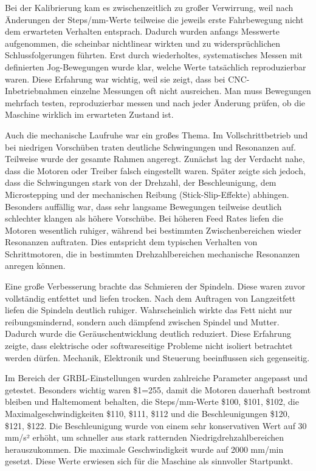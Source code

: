 Bei der Kalibrierung kam es zwischenzeitlich zu großer Verwirrung, weil nach Änderungen der Steps/mm-Werte teilweise die jeweils erste Fahrbewegung nicht dem erwarteten Verhalten entsprach. Dadurch wurden anfangs Messwerte aufgenommen, die scheinbar nichtlinear wirkten und zu widersprüchlichen Schlussfolgerungen führten. Erst durch wiederholtes, systematisches Messen mit definierten Jog-Bewegungen wurde klar, welche Werte tatsächlich reproduzierbar waren. Diese Erfahrung war wichtig, weil sie zeigt, dass bei CNC-Inbetriebnahmen einzelne Messungen oft nicht ausreichen. Man muss Bewegungen mehrfach testen, reproduzierbar messen und nach jeder Änderung prüfen, ob die Maschine wirklich im erwarteten Zustand ist.

Auch die mechanische Laufruhe war ein großes Thema. Im Vollschrittbetrieb und bei niedrigen Vorschüben traten deutliche Schwingungen und Resonanzen auf. Teilweise wurde der gesamte Rahmen angeregt. Zunächst lag der Verdacht nahe, dass die Motoren oder Treiber falsch eingestellt waren. Später zeigte sich jedoch, dass die Schwingungen stark von der Drehzahl, der Beschleunigung, dem Microstepping und der mechanischen Reibung (Stick-Slip-Effekte) abhingen. Besonders auffällig war, dass sehr langsame Bewegungen teilweise deutlich schlechter klangen als höhere Vorschübe. Bei höheren Feed Rates liefen die Motoren wesentlich ruhiger, während bei bestimmten Zwischenbereichen wieder Resonanzen auftraten. Dies entspricht dem typischen Verhalten von Schrittmotoren, die in bestimmten Drehzahlbereichen mechanische Resonanzen anregen können.

Eine große Verbesserung brachte das Schmieren der Spindeln. Diese waren zuvor vollständig entfettet und liefen trocken. Nach dem Auftragen von Langzeitfett liefen die Spindeln deutlich ruhiger. Wahrscheinlich wirkte das Fett nicht nur reibungsmindernd, sondern auch dämpfend zwischen Spindel und Mutter. Dadurch wurde die Geräuschentwicklung deutlich reduziert. Diese Erfahrung zeigte, dass elektrische oder softwareseitige Probleme nicht isoliert betrachtet werden dürfen. Mechanik, Elektronik und Steuerung beeinflussen sich gegenseitig.

Im Bereich der GRBL-Einstellungen wurden zahlreiche Parameter angepasst und getestet. Besonders wichtig waren \$1=255, damit die Motoren dauerhaft bestromt bleiben und Haltemoment behalten, die Steps/mm-Werte \$100, \$101, \$102, die Maximalgeschwindigkeiten \$110, \$111, \$112 und die Beschleunigungen \$120, \$121, \$122. Die Beschleunigung wurde von einem sehr konservativen Wert auf 30 mm/s² erhöht, um schneller aus stark ratternden Niedrigdrehzahlbereichen herauszukommen. Die maximale Geschwindigkeit wurde auf 2000 mm/min gesetzt. Diese Werte erwiesen sich für die Maschine als sinnvoller Startpunkt.

